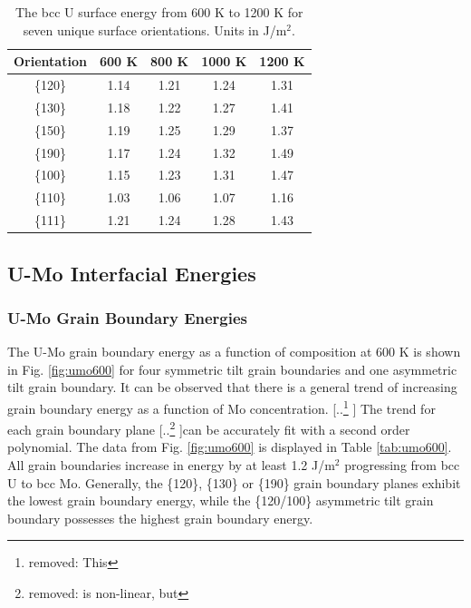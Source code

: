 \documentclass[review]{elsarticle}
\providecommand{\DIFaddtex}[1]{{\protect\color{blue} \sf #1}} %
\providecommand{\DIFdeltex}[1]{{\protect\color{red} [..\footnote{removed: #1} ]}} %
\providecommand{\DIFaddbegin}{} %
\providecommand{\DIFaddend}{} %
\providecommand{\DIFdelbegin}{} %
\providecommand{\DIFdelend}{} %
\providecommand{\DIFadd}[1]{\texorpdfstring{\DIFaddtex{#1}}{#1}} %
\providecommand{\DIFdel}[1]{\texorpdfstring{\DIFdeltex{#1}}{}} %
\newcommand{\DIFscaledelfig}{0.5}
\newlength{\DIFdelgraphicswidth} %
\newlength{\DIFdelgraphicsheight} %
\newcommand{\DIFaddincludegraphics}[2][]{{\color{blue}\fbox{\DIFOincludegraphics[#1]{#2}}}} %
\newcommand{\DIFdelincludegraphics}[2][]{%
\sbox{\DIFdelgraphicsbox}{\DIFOincludegraphics[#1]{#2}}%
\settoboxwidth{\DIFdelgraphicswidth}{\DIFdelgraphicsbox} %
\settoboxtotalheight{\DIFdelgraphicsheight}{\DIFdelgraphicsbox} %
\scalebox{\DIFscaledelfig}{%
\parbox[b]{\DIFdelgraphicswidth}{\usebox{\DIFdelgraphicsbox}\\[-\baselineskip] \rule{\DIFdelgraphicswidth}{0em}}\llap{\resizebox{\DIFdelgraphicswidth}{\DIFdelgraphicsheight}{%
\setlength{\unitlength}{\DIFdelgraphicswidth}%
\begin{picture}(1,1)%
\thicklines\linethickness{2pt} %
{\color[rgb]{1,0,0}\put(0,0){\framebox(1,1){}}}%
{\color[rgb]{1,0,0}\put(0,0){\line( 1,1){1}}}%
{\color[rgb]{1,0,0}\put(0,1){\line(1,-1){1}}}%
\end{picture}%
}\hspace*{3pt}}} %
} %
\DeclareRobustCommand{\DIFaddbegin}{\DIFOaddbegin \let\includegraphics\DIFaddincludegraphics} %
\DeclareRobustCommand{\DIFaddend}{\DIFOaddend \let\includegraphics\DIFOincludegraphics} %
\DeclareRobustCommand{\DIFdelbegin}{\DIFOdelbegin \let\includegraphics\DIFdelincludegraphics} %
\DeclareRobustCommand{\DIFdelend}{\DIFOaddend \let\includegraphics\DIFOincludegraphics} %
\begin{document}
\begin{table}[h]
\caption{The bcc U surface energy from 600 K to 1200 K for seven unique surface orientations. Units in J/m$^{2}$. } \label{tab:usurf}
\begin{center}
\begin{tabular}{|c|c|c|c|c|}
	\hline
	Orientation & 600 K & 800 K & 1000 K & 1200 K \\
	 \hline
	 \{120\} & 1.14 & 1.21 & 1.24 & 1.31 \\
	 \{130\} & 1.18 & 1.22 & 1.27 & 1.41 \\
	 \{150\} & 1.19 & 1.25 & 1.29 & 1.37 \\
	 \{190\} & 1.17 & 1.24 & 1.32 & 1.49 \\
	 \{100\} & 1.15 & 1.23 & 1.31 & 1.47 \\
	 \{110\} & 1.03 & 1.06 & 1.07 & 1.16 \\
	 \{111\} & 1.21 & 1.24 & 1.28 & 1.43 \\	 
	 \hline
\end{tabular}
\end{center}
\label{default}
\end{table}

\FloatBarrier

\subsection{U-Mo Interfacial Energies}
\subsubsection{U-Mo Grain Boundary Energies}

The U-Mo grain boundary energy as a function of composition at 600 K is shown in Fig. \ref{fig:umo600} for four symmetric tilt grain boundaries and one asymmetric tilt grain boundary. It can be observed that there is a general trend of increasing grain boundary energy as a function of Mo concentration. \DIFdelbegin \DIFdel{This }\DIFdelend \DIFaddbegin \DIFadd{The }\DIFaddend trend for each grain boundary plane \DIFdelbegin \DIFdel{is non-linear, but }\DIFdelend can be accurately fit with a second order polynomial. The data from Fig. \ref{fig:umo600} is displayed in Table \ref{tab:umo600}. All grain boundaries increase in energy by at least 1.2 J/m$^{2}$ progressing from bcc U to bcc Mo. Generally, the \{120\}, \{130\} or \{190\} grain boundary planes exhibit the lowest grain boundary energy, while the \{120/100\} asymmetric tilt grain boundary possesses the highest grain boundary energy. 
\end{document}
